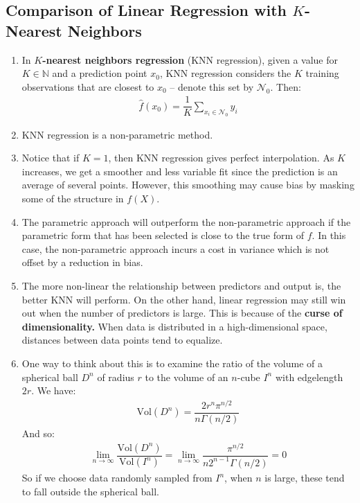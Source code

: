 \documentclass[10pt]{article}
\begin{document}
\subsection{Comparison of Linear Regression with $K$-Nearest Neighbors}
\begin{enumerate}
	\item In \textbf{$K$-nearest neighbors regression} (KNN regression), given a value for $K \in \mathbb{N}$ and a prediction point $x_0$, KNN regression considers the $K$ training observations that are closest to $x_0$ -- denote this set by $\mathcal{N}_0$.  Then: \begin{align*}
		\hat f(x_0) = \dfrac{1}{K} \sum_{x_i \in \mathcal{N}_0} y_i 
	\end{align*}
	\item KNN regression is a non-parametric method.
	\item Notice that if $K = 1$, then KNN regression gives perfect interpolation.  As $K$ increases, we get a smoother and less variable fit since the prediction is an average of several points.  However, this smoothing may cause bias by masking some of the structure in $f(X)$.
	\item The parametric approach will outperform the non-parametric approach if the parametric form that has been selected is close to the true form of $f$.  In this case, the non-parametric approach incurs a cost in variance which is not offset by a reduction in bias.
	\item The more non-linear the relationship between predictors and output is, the better KNN will perform.  On the other hand, linear regression may still win out when the number of predictors is large.  This is because of the \textbf{curse of dimensionality.} When data is distributed in a high-dimensional space, distances between data points tend to equalize.  
	\item {\color{brown} One way to think about this is to examine the ratio of the volume of a spherical ball $D^n$ of radius $r$ to the volume of an $n$-cube $I^n$ with edgelength $2r$.  We have:
	\begin{align*}
		\mathrm{Vol}(D^n) = \dfrac{2r^n \pi^{n/2}}{n \Gamma(n/2)}
	\end{align*}
	And so:
	\begin{align*}
		\lim_{n \to \infty} \dfrac{\mathrm{Vol}(D^n)}{\mathrm{Vol}(I^n)} = \lim_{n \to \infty} \dfrac{\pi^{n/2}}{n 2^{n - 1} \Gamma(n/2)} = 0
	\end{align*}
	So if we choose data randomly sampled from $I^n$, when $n$ is large, these tend to fall outside the spherical ball.
	
}
\end{enumerate}
\end{document}
